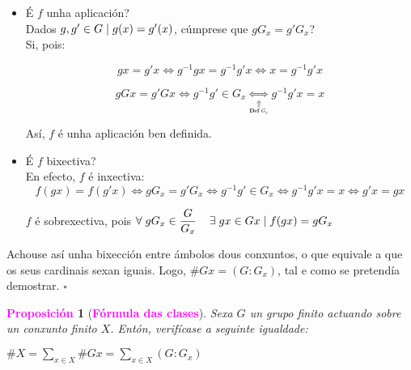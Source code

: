 \documentclass[twoside]{report}
\newcommand{\magbf}[1]{\textcolor{magenta}{\textbf{#1}}} %
\theoremstyle{mystyle}
\newtheorem{prop}{\magbf{Proposición}}[chapter]
\newenvironment{proposition}
{\begin{mdframed}[linecolor = magenta,backgroundcolor = classicrose, linewidth = 2mm]\begin{prop}}
{\end{prop}\end{mdframed}}
\begin{document}
\begin{itemize}
    
    \item É $f$ unha aplicación?\\
    
    Dados $g, g' \in G \hspace{1mm} | \hspace{1mm} g(x) = g'(x)$, cúmprese que $gG_{x} = g'G_{x}$?\\
    
    Si, pois:
    
    $$gx = g'x \Longleftrightarrow g^{-1}gx = g^{-1}g'x \Longleftrightarrow x = g^{-1}g'x$$
    
    $$gGx = g'Gx \Longleftrightarrow g^{-1}g' \in G_{x} \underset{\underset{\textbf{Def } G_{x}}{\Uparrow}}{\Longleftrightarrow} g^{-1}g'x = x$$
    
    Así, $f$ é unha aplicación ben definida.\\
    
    \item É $f$ bixectiva?\\
    
    En efecto, $f$ é inxectiva:
    $$f(gx) = f(g'x) \Longleftrightarrow gG_{x} = g'G_{x} \Longleftrightarrow g^{-1}g' \in G_{x} \Longleftrightarrow g^{-1}g'x = x \Longleftrightarrow g'x = gx$$
    
    $f$ é sobrexectiva, pois $\forall \hspace{1mm} gG_{x} \in \displaystyle \frac{G}{G_{x}} \hspace{4mm} \exists \hspace{1mm} gx \in Gx \hspace{1mm} | \hspace{1mm} f(gx) = gG_{x}$
    
\end{itemize}

\noindent Achouse así unha bixección entre ámbolos dous conxuntos, o que equivale a que os seus cardinais sexan iguais. Logo, $\#Gx = (G : G_{x})$, tal e como se pretendía demostrar. $\square$

\vspace{3mm}

\begin{proposition}[\magbf{Fórmula das clases}] \label{prop1.11}
Sexa $G$ un grupo finito actuando sobre un conxunto finito $X$. Entón, verifícase a seguinte igualdade:
\begin{center}
    $\#X = \underset{x \in X}{\sum}\#Gx = \underset{x \in X}{\sum}(G:G_{x})$
\end{center}
\end{proposition}
\end{document}
